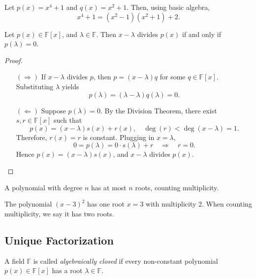 \begin{example}\label{ex:division}
Let \(p(x) = x^4 + 1\) and \(q(x) = x^2 + 1\). Then, using basic algebra,
\[
x^4 + 1 = (x^2 - 1)(x^2 + 1) + 2.
\]
\end{example}

\begin{theorem}\label{thm:root}
Let \(p(x) \in \mathbb{F}[x]\), and \(\lambda \in \mathbb{F}\). Then \(x - \lambda\) divides \(p(x)\) if and only if \(p(\lambda) = 0\).
\end{theorem}

\begin{proof}
\leavevmode
\begin{enumerate}
  \item[\((\Rightarrow)\)] If \(x - \lambda\) divides \(p\), then \(p = (x - \lambda) q\) for some \(q \in \mathbb{F}[x]\). Substituting \(\lambda\) yields
  \[
  p(\lambda) = (\lambda - \lambda) q(\lambda) = 0.
  \]

  \item[\((\Leftarrow)\)] Suppose \(p(\lambda) = 0\). By the Division Theorem, there exist \(s, r \in \mathbb{F}[x]\) such that
  \[
  p(x) = (x - \lambda)s(x) + r(x), \quad \deg(r) < \deg(x - \lambda) = 1. \tag{6.1}
  \]
  Therefore, \(r(x) = r\) is constant. Plugging in \(x = \lambda\),
  \[
  0 = p(\lambda) = 0 \cdot s(\lambda) + r \quad \Rightarrow \quad r = 0.
  \]
  Hence \(p(x) = (x - \lambda)s(x)\), and \(x - \lambda\) divides \(p(x)\).
\end{enumerate}
\end{proof}


\begin{corollary}
A polynomial with degree \(n\) has at most \(n\) roots, counting multiplicity.
\end{corollary}

\begin{example}
The polynomial \((x - 3)^2\) has one root \(x = 3\) with multiplicity 2. When counting multiplicity, we say it has two roots.
\end{example}

\subsection{Unique Factorization}
\begin{definition}
A field \(\mathbb{F}\) is called \emph{algebraically closed} if every non-constant polynomial \(p(x) \in \mathbb{F}[x]\) has a root \(\lambda \in \mathbb{F}\).
\end{definition}

